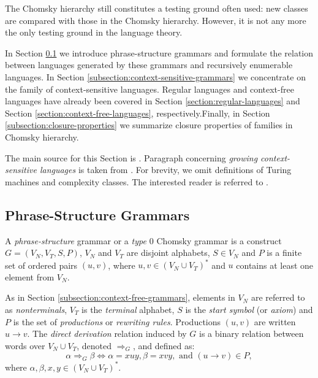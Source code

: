 The Chomsky hierarchy still constitutes a testing ground often used: new classes are compared with those in the Chomsky hierarchy. However, it is not any more the only testing ground in the language theory.

In Section \ref{subsection:phrase-structure-grammars} we introduce phrase-structure grammars and formulate the relation between languages generated by these grammars and  recursively enumerable languages. In Section \ref{subsection:context-sensitive-grammars} we concentrate on the family of context-sensitive languages. Regular languages and context-free languages have already been covered in Section \ref{section:regular-languages} and Section \ref{section:context-free-languages}, respectively.Finally, in Section \ref{subsection:closure-properties} we summarize closure properties of families in Chomsky hierarchy.


The main source for this Section is \cite{MaSa1997formal, MaSa1997aspects}. Paragraph concerning \emph{growing context-sensitive 
languages} is taken from \cite{Buntrock19981}. For brevity, we omit definitions of Turing machines and complexity classes. The interested reader is referred to \cite{MaSa1997aspects}.

\subsection{Phrase-Structure Grammars}
\label{subsection:phrase-structure-grammars}

A \emph{phrase-structure} grammar or a \emph{type $0$} Chomsky grammar is a construct $G = (V_N, V_T, S, P)$, $V_N$ and $V_T$ are disjoint alphabets, $S \in V_N$ and $P$ is a finite set of ordered pairs $(u, v)$, where $u, v \in (V_N \cup V_T)^*$ and $u$ contains at least one element from $V_N$.

As in Section \ref{subsection:context-free-grammars}, elements in $V_N$ are referred to as \emph{nonterminals}, $V_T$ is the  \emph{terminal} alphabet, $S$ is the \emph{start symbol} (or \emph{axiom}) and $P$ is the set of  \emph{productions} or \emph{rewriting rules}. Productions $(u, v)$ are written $u \to v$. The \emph{direct derivation} relation induced by $G$ is a binary relation between words over $V_N \cup V_T$, denoted $\Rightarrow_G$, and defined as: $$\alpha \Rightarrow_G \beta \Leftrightarrow \alpha = xuy, \beta = xvy, \text{ and } (u \to v) \in P,$$ where $\alpha, \beta, x, y \in (V_N \cup V_T)^*$.

